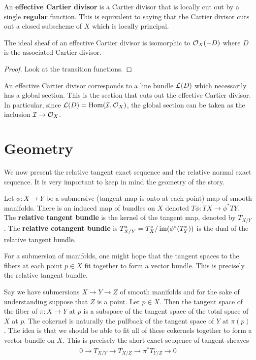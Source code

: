 \documentclass[12pt]{article}
\begin{document}
\begin{definition}
    An \textbf{effective Cartier divisor} is a Cartier divisor that is locally cut out by a single \textbf{regular} function. This is equivalent to saying that the Cartier divisor cuts out a closed subscheme of $X$ which is locally principal. 
\end{definition}

\begin{proposition}
    The ideal sheaf of an effective Cartier divisor is isomorphic to ${\mathcal{O}}_X(-D)$ where $D$ is the associated Cartier divisor.
\end{proposition}

\begin{proof}
    Look at the transition functions.
\end{proof}

An effective Cartier divisor corresponds to a line bundle ${\mathcal{L}}(D)$ which necessarily has a global section. This is the section that cuts out the effective Cartier divisor. In particular, since ${\mathcal{L}}(D) = \operatorname{Hom}({\mathcal{I}},{\mathcal{O}}_X)$, the global section can be taken as the inclusion ${\mathcal{I}} \to {\mathcal{O}}_X$.


\section{Geometry}
We now present the relative tangent exact sequence and the relative normal exact sequence.
It is very important to keep in mind the geometry of the story. 

\begin{definition}
    Let $\phi:X\to Y$ be a submersive (tangent map is onto at each point) map of smooth manifolds.
    There is an induced map of bundles on $X$ denoted $T\phi:TX\to \phi^*TY$.
    The \textbf{relative tangent bundle} is the kernel of the tangent map, denoted by $T_{X/Y}$.
    The \textbf{relative cotangent bundle} is $T^*_{X/Y} = T_X^*/\operatorname{im}(\phi^*(T_Y^*))$ is the dual of the relative tangent bundle.
\end{definition}

\begin{example}
    For a submersion of manifolds, one might hope that the tangent spaces to the fibers at each point $p\in X$
    fit together to form a vector bundle. This is precisely the relative tangent bundle.
\end{example}

Say we have submersions $X\to Y\to Z$ of smooth manifolds and for the sake of understanding suppose that $Z$ is a point. Let $p\in X$.
Then the tangent space of the fiber of $\pi:X\to Y$ at $p$ is a subspace of the tangent space of the total space of $X$ at $p$. The cokernel 
is naturally the pullback of the tangent space of $Y$ at $\pi(p)$. The idea is that we 
should be able to fit all of these cokernels together to form a vector bundle on $X$. This is precisely the short exact seuqence
of tangent sheaves \begin{align*}
    0\to T_{X/Y}\to T_{X/Z}\to \pi^*T_{Y/Z}\to 0
\end{align*}
\end{document}
